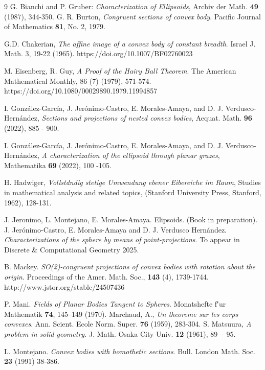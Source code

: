 \documentclass[12pt]{amsart}
\begin{document}
  
\begin{thebibliography}{9}
 G. Bianchi and P. Gruber: \emph{Characterization of Ellipsoids}, Archiv der Math. {\bf 49} (1987), 344-350.
  G. R. Burton, \emph{Congruent sections of convex body}. Pacific Journal of Mathematics {\bf 81}, No. 2, 1979.
 
 G.D. Chakerian, \emph{The affine image of a convex body of constant breadth}. Israel J. Math. 3, 19-22 (1965). https://doi.org/10.1007/BF02760023 
 
 M. Eisenberg, R. Guy,  \emph{A Proof of the Hairy Ball Theorem}. The American Mathematical Monthly, 86 (7)  (1979), 571-574. https://doi.org/10.1080/00029890.1979.11994857
  
 I. Gonz\'alez-Garc\'ia, J. Jer\'onimo-Castro, E. Morales-Amaya, and D. J. Verdusco- Hern\'andez, \emph{Sections and projections of nested convex bodies}, Aequat. Math. {\bf 96} (2022), 885 - 900.

 I. Gonz\'alez-Garc\'ia, J. Jer\'onimo-Castro, E. Morales-Amaya, and D. J. Verdusco- Hern\'andez, \emph{A characterization of the ellipsoid through planar grazes}, Mathematika {\bf 69} (2022), 100 -105.

 H. Hadwiger, \emph{Vollstdndig stetige Umwendung ebener Eibereiche im Raum}, Studies in mathematical analysis and related topics, (Stanford University Press, Stanford, 1962), 128-131.
  
 J. Jeronimo, L. Montejano, E. Morales-Amaya. Elipsoids. (Book in preparation).
 J. Jer\'onimo-Castro, E. Morales-Amaya  and D. J. Verdusco Hern\'andez. \emph{Characterizations of the sphere by means of point-projections}. To appear in Discrete \& Computational Geometry 2025.

 B. Mackey. \emph{SO(2)-congruent projections of convex bodies with rotation about the origin}. Proceedings of the Amer. Math. Soc., {\bf143} (4), 1739-1744. http://www.jstor.org/stable/24507436

 P. Mani. \emph{Fields of Planar Bodies Tangent to Spheres}. Monatshefte f\''ur Mathematik {\bf 74}, 145--149 (1970).
 Marchaud, A., \emph{Un theoreme sur les corps convexes}. Ann. Scient. Ecole Norm. Super. {\bf 76} (1959), 283-304.
 S. Matsuura, \emph{A problem in solid geometry.}  J. Math. Osaka City Univ. {\bf 12} (1961), $89-95.$

 
 L. Montejano. \emph{Convex bodies with homothetic sections}. Bull. London Math. Soc. {\bf 23} (1991) 38-386.


\end{thebibliography}
\end{document}
